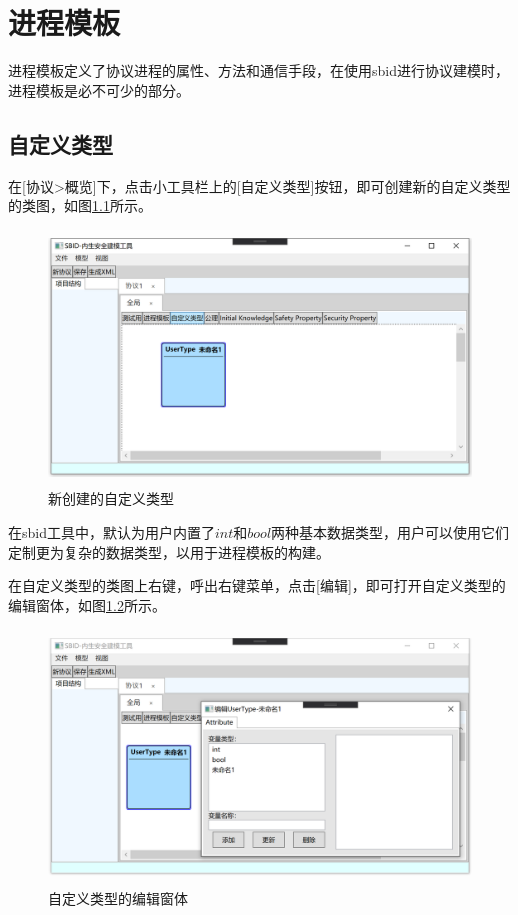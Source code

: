 \chapter{进程模板}

进程模板定义了协议进程的属性、方法和通信手段，在使用sbid进行协议建模时，进程模板是必不可少的部分。

\section{自定义类型}
在[协议>概览]下，点击小工具栏上的[自定义类型]按钮，即可创建新的自定义类型的类图，如图\ref{create_usertype}所示。
    \begin{figure}[h]
	\centering
	\includegraphics[width=12cm,height=6.75cm]{imgs/create_usertype.png}
	\caption{新创建的自定义类型}
	\label{create_usertype}
	\end{figure}
\par
在sbid工具中，默认为用户内置了$int$和$bool$两种基本数据类型，用户可以使用它们定制更为复杂的数据类型，以用于进程模板的构建。
\par
在自定义类型的类图上右键，呼出右键菜单，点击[编辑]，即可打开自定义类型的编辑窗体，如图\ref{usertype_edit_window}所示。
\begin{figure}[h]
	\centering
	\includegraphics[width=12cm,height=6.75cm]{imgs/usertype_edit_window.png}
	\caption{自定义类型的编辑窗体}
	\label{usertype_edit_window}
\end{figure}
